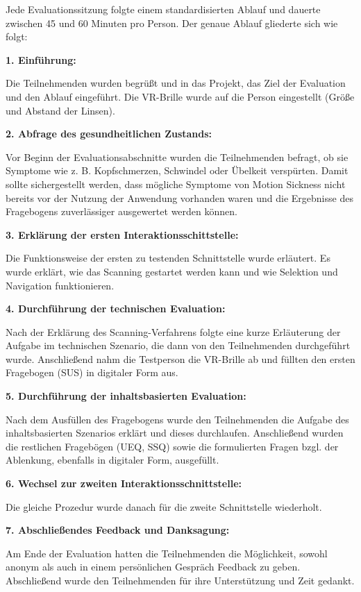 Jede Evaluationssitzung folgte einem standardisierten Ablauf und dauerte zwischen 45 und 60 Minuten pro Person. Der genaue Ablauf gliederte sich wie folgt:

{\normalfont \bfseries 1. Einführung:}

Die Teilnehmenden wurden begrüßt und in das Projekt, das Ziel der Evaluation und den Ablauf eingeführt. Die VR-Brille wurde auf die Person eingestellt (Größe und Abstand der Linsen). 

{\normalfont \bfseries 2. Abfrage des gesundheitlichen Zustands:}

Vor Beginn der Evaluationsabschnitte wurden die Teilnehmenden befragt, ob sie Symptome wie z. B. Kopfschmerzen, Schwindel oder Übelkeit verspürten. Damit sollte sichergestellt werden, dass mögliche Symptome von Motion Sickness nicht bereits vor der Nutzung der Anwendung vorhanden waren und die Ergebnisse des Fragebogens zuverlässiger ausgewertet werden können. 

{\normalfont \bfseries 3. Erklärung der ersten Interaktionsschittstelle:}

Die Funktionsweise der ersten zu testenden Schnittstelle wurde erläutert. Es wurde erklärt, wie das Scanning gestartet werden kann und wie Selektion und Navigation funktionieren. 

{\normalfont \bfseries 4. Durchführung der technischen Evaluation:}

Nach der Erklärung des Scanning-Verfahrens folgte eine kurze Erläuterung der Aufgabe im technischen Szenario, die dann von den Teilnehmenden durchgeführt wurde. Anschließend nahm die Testperson die VR-Brille ab und füllten den ersten Fragebogen (SUS) in digitaler Form aus. 

{\normalfont \bfseries 5. Durchführung der inhaltsbasierten Evaluation:}

Nach dem Ausfüllen des Fragebogens wurde den Teilnehmenden die Aufgabe des inhaltsbasierten Szenarios erklärt und dieses durchlaufen. Anschließend wurden die restlichen Fragebögen (UEQ, SSQ) sowie die formulierten Fragen bzgl. der Ablenkung, ebenfalls in digitaler Form, ausgefüllt.

{\normalfont \bfseries 6. Wechsel zur zweiten Interaktionsschnittstelle:}

Die gleiche Prozedur wurde danach für die zweite Schnittstelle wiederholt.

{\normalfont \bfseries 7. Abschließendes Feedback und Danksagung:}

Am Ende der Evaluation hatten die Teilnehmenden die Möglichkeit, sowohl anonym als auch in einem persönlichen Gespräch Feedback zu geben. Abschließend wurde den Teilnehmenden für ihre Unterstützung und Zeit gedankt. 

